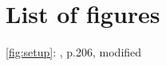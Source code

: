 \newpage
{}
\renewcommand{\refname}{Quellen}   
\renewcommand{\bibname}{Quellen} %



\nocite{Jupyter}
\nocite{Vorbereitungshilfe}
\section*{List of figures}
\autoref{fig:setup}:  \cite{Vorbereitungshilfe}, p.206, modified\\
